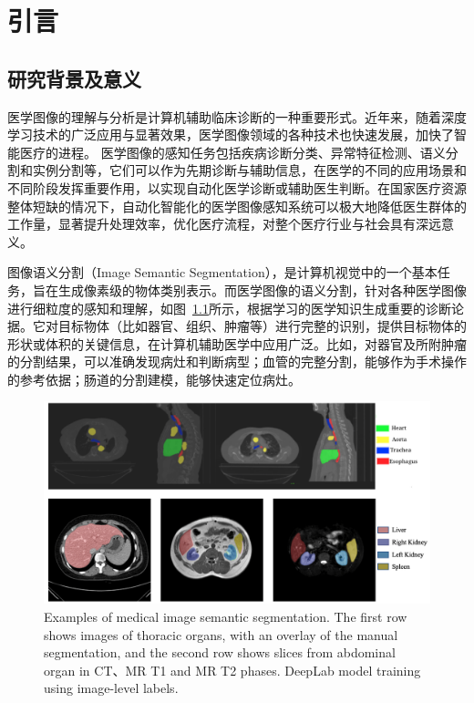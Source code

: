 \chapter{引言}

\section{研究背景及意义}
医学图像的理解与分析是计算机辅助临床诊断的一种重要形式。近年来，随着深度学习技术的广泛应用与显著效果，医学图像领域的各种技术也快速发展，加快了智能医疗的进程。
医学图像的感知任务包括疾病诊断分类、异常特征检测、语义分割和实例分割等，它们可以作为先期诊断与辅助信息，在医学的不同的应用场景和不同阶段发挥重要作用，以实现自动化医学诊断或辅助医生判断。在国家医疗资源整体短缺的情况下，自动化智能化的医学图像感知系统可以极大地降低医生群体的工作量，显著提升处理效率，优化医疗流程，对整个医疗行业与社会具有深远意义。


图像语义分割（Image Semantic Segmentation），是计算机视觉中的一个基本任务，旨在生成像素级的物体类别表示\citep{long2015fully,chen2017deeplab,ronneberger2015u,isensee2019automated}。而医学图像的语义分割，针对各种医学图像进行细粒度的感知和理解，如图~\ref{c1_fig1}所示，根据学习的医学知识生成重要的诊断论据。它对目标物体（比如器官、组织、肿瘤等）进行完整的识别，提供目标物体的形状或体积的关键信息，在计算机辅助医学中应用广泛。比如，对器官及所附肿瘤的分割结果，可以准确发现病灶和判断病型；血管的完整分割，能够作为手术操作的参考依据；肠道的分割建模，能够快速定位病灶。

    \begin{figure}[t!]
        \centering 
        \includegraphics[width=1.0\textwidth]{img/c1/intro_1.png}
        {Examples of medical image semantic segmentation. The first row shows images of thoracic organs, with an overlay of the manual segmentation, and the second row shows slices from abdominal organ in CT、MR T1 and MR T2 phases.
        DeepLab model training using image-level labels.}
        \label{c1_fig1}
    \end{figure}

